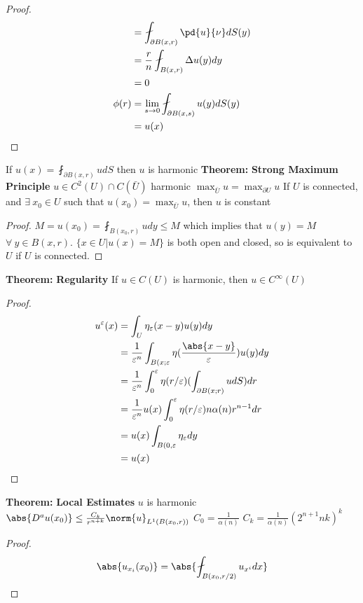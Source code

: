 \documentclass[14pt]{extarticle}
\def\Theorem{{\color{red} \textbf{Theorem:} }}
\begin{document}
\begin{outline}
\begin{proof}
\begin{align*}
										 &= \fint_{\partial B(x,r)} \pd{u}{\nu}dS(y) \\
										 &= \frac{r}{n}\fint_{B(x,r)} \Delta u(y) dy \\
										 &= 0 \\
						\phi(r) &= \lim_{s \rightarrow 0} \fint_{\partial B(x,s)} u(y)dS(y) \\
										&= u(x) \\
					\end{align*}
				\end{proof}
		\2	If $u(x) = \fint_{\partial B(x,r)} u dS$ then $u$ is harmonic
	\1	\Theorem \textbf{Strong Maximum Principle}
		\2	$u \in C^2(U) \cap C(\bar{U})$ harmonic
		\2	$\max_{\bar{U}} u = \max_{\partial U} u$
		\2	If $U$ is connected, and $\exists~x_0 \in U$ such that
				$u(x_0) = \max_{\bar{U}} u$, then $u$ is constant
		\2	\begin{proof}
					$M = u(x_0) = \fint_{B(x_0,r)} u dy \le M$ which implies that
				$u(y) = M$ $\forall~y \in B(x,r)$.  $\{x \in U | u(x) = M\}$ is both
				open and closed, so is equivalent to $U$ if $U$ is connected.
				\end{proof}
		\1	\Theorem \textbf{Regularity}
			\2	If $u \in C(U)$ is harmonic, then $u \in C^{\infty}(U)$
			\2	\begin{proof}
						\begin{align*}
							u^{\varepsilon}(x) &= \int_U \eta_{\varepsilon}(x-y)u(y)dy \\
								&= \frac{1}{\varepsilon^n} \int_{B(x;\varepsilon}\eta(\frac{\abs{x-y}}{\varepsilon})u(y)dy \\
								&= \frac{1}{\varepsilon^n}\int_0^{\varepsilon}\eta(r/\varepsilon)
								(\int_{\partial B(x;r)}u dS)dr \\
								&= \frac{1}{\varepsilon^n}u(x) \int_0^{\varepsilon}\eta(r/\varepsilon)
								n\alpha(n)r^{n-1}dr \\
								&= u(x) \int_{B(0,\varepsilon} \eta_{\varepsilon}dy \\
								&= u(x)
						\end{align*}
					\end{proof}
		\1	\Theorem \textbf{Local Estimates}
			\2	$u$ is harmonic
			\2	$\abs{D^au(x_0)} \le \frac{C_k}{r^{n+k}}\norm{u}_{L^1(B(x_0,r))}$ 
				\3	$C_0 = \frac{1}{\alpha(n)}$
				\3	$C_k = \frac{1}{\alpha(n)}(2^{n+1}nk)^k$
			\2	\begin{proof}
						\begin{align*}
              \abs{u_{x_i}(x_0)} &= \abs{\fint_{B(x_0,r/2)} u_{x^i}dx} \\

\end{align*}
\end{proof}
\end{outline}
\end{document}

